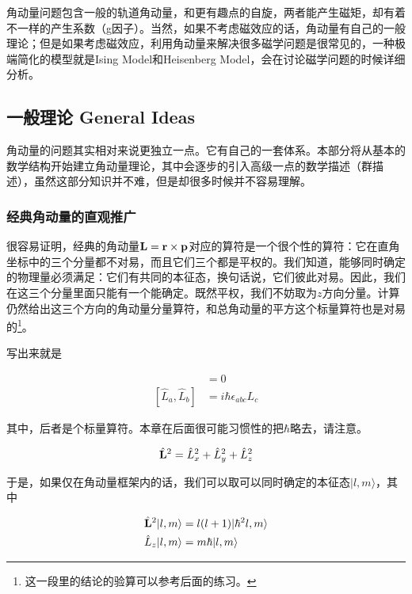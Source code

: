 
角动量问题包含一般的轨道角动量，和更有趣点的自旋，两者能产生磁矩，却有着不一样的产生系数（g因子）。当然，如果不考虑磁效应的话，角动量有自己的一般理论；但是如果考虑磁效应，利用角动量来解决很多磁学问题是很常见的，一种极端简化的模型就是Ising Model和Heisenberg Model，会在讨论磁学问题的时候详细分析。

\subsection{一般理论 General Ideas}

角动量的问题其实相对来说更独立一点。它有自己的一套体系。本部分将从基本的数学结构开始建立角动量理论，其中会逐步的引入高级一点的数学描述（群描述），虽然这部分知识并不难，但是却很多时候并不容易理解。\\

\subsubsection{经典角动量的直观推广}

很容易证明，经典的角动量$\bf L = r\times p$对应的算符是一个很个性的算符：它在直角坐标中的三个分量都不对易，而且它们三个都是平权的。我们知道，能够同时确定的物理量必须满足：它们有共同的本征态，换句话说，它们彼此对易。因此，我们在这三个分量里面只能有一个能确定。既然平权，我们不妨取为$z$方向分量。计算仍然给出这三个方向的角动量分量算符，和总角动量的平方这个标量算符也是对易的\footnote{这一段里的结论的验算可以参考后面的练习。}。

写出来就是

\begin{align}
[\hat L_z, \hat{\bf L}^2] &= 0\\
[\hat L_a, \hat L_b] &= i\hbar\epsilon_{abc}L_c
\end{align}

其中，后者是个标量算符。本章在后面很可能习惯性的把$\hbar$略去，请注意。

\begin{equation}
\hat{\bf L}^2 = \hat L_x^2+\hat L_y^2+\hat L_z^2
\end{equation}

于是，如果仅在角动量框架内的话，我们可以取可以同时确定的本征态$|l,m\rangle$，其中

\begin{align}
\hat{\bf L}^2|l,m\rangle &= l(l+1)|\hbar^2l,m\rangle\\
\hat L_z|l,m\rangle &= m\hbar|l,m\rangle
\end{align}

